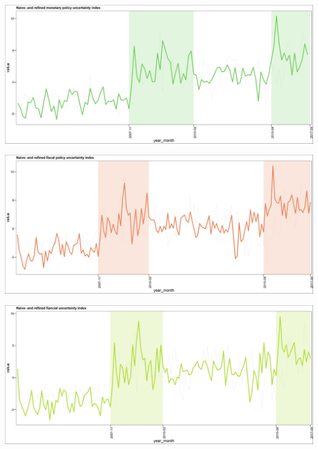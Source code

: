 \documentclass[11pt,preprint, authoryear]{elsarticle}
\let\origfigure\figure
\let\endorigfigure\endfigure
\renewenvironment{figure}[1][2] {
    \expandafter\origfigure\expandafter[H]
} {
    \endorigfigure
}
\numberwithin{equation}{section}
\numberwithin{figure}{section}
\numberwithin{table}{section}
\begin{document}
\begin{figure}
	\centering
	\includegraphics[width=\linewidth, keepaspectratio]{bin/monetary_comps}\\
	\caption{Composite Monetary Policy uncertainty refined index.\label{mon_comp_final}}
\end{figure}



\begin{figure}
	\centering
	\includegraphics[width=\linewidth, keepaspectratio]{bin/fiscal_comps}\\
	\caption{Composite Fiscal Policy uncertainty refined index. \label{fis_comp_final}}
\end{figure}


\begin{figure}
	\centering
	\includegraphics[width=\linewidth, keepaspectratio]{bin/financial_comps}\\
	\caption{Composite Financial market uncertainty refined index. \label{fin_comp_final}}
\end{figure}
\end{document}
